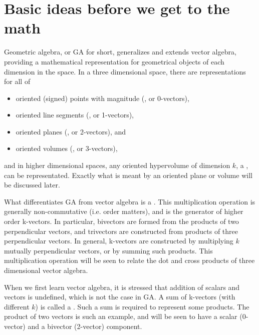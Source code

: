 \section{Basic ideas before we get to the math}
Geometric algebra, or GA for short, generalizes and extends vector algebra, providing a mathematical representation for geometrical objects of each dimension in the space.
In a three dimensional space, there are representations for all of

\begin{itemize}
\item
oriented (signed) points with magnitude (, or 0-vectors),
\item
oriented line segments (, or 1-vectors),
\item
oriented planes (, or 2-vectors), and
\item
oriented volumes (, or 3-vectors),
\end{itemize}

and in higher dimensional spaces, any oriented hypervolume of dimension \( k \), a , can be representated.
Exactly what is meant by an oriented plane or volume will be discussed later.

What
differentiates GA from vector algebra is a .
This
multiplication operation is generally non-commutative (i.e. order matters), and is the generator of higher order k-vectors.
In particular,
bivectors are formed from the products of two perpendicular vectors,
and trivectors are constructed from products of three perpendicular vectors.
In general, k-vectors are constructed by multiplying \( k \) mutually perpendicular vectors, or by summing such products.
This multiplication operation will be seen to relate the dot and cross products of three dimensional vector algebra.

When we first learn vector algebra, it is stressed that addition of scalars and vectors is undefined, which is not the case in GA.
A sum of k-vectors (with different \(k\)) is called a .  Such a sum is 
required to represent some products.  
The 
product of two vectors is such an example, and will be seen to have a scalar (0-vector) and a bivector (2-vector) component.


